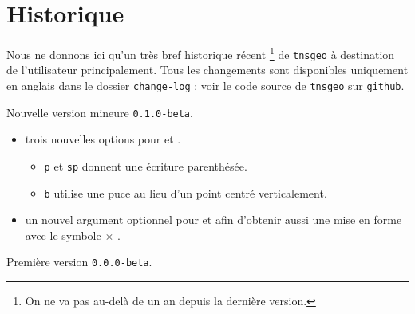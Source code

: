 \documentclass[12pt,a4paper]{article}
\begin{document}
\newpage

\section{Historique}

Nous ne donnons ici qu'un très bref historique récent
\footnote{
	On ne va pas au-delà de un an depuis la dernière version.
}
de \verb+tnsgeo+ à destination de l'utilisateur principalement.
Tous les changements sont disponibles uniquement en anglais dans le dossier \verb+change-log+ : voir le code source de \verb+tnsgeo+ sur \verb+github+.

\begin{description}

    \medskip
    \item[2020-07-17] Nouvelle version mineure \verb+0.1.0-beta+.
    
    \begin{itemize}[itemsep=.5em]
        \item {}
              trois nouvelles options pour  et .
        \begin{itemize}[itemsep=.5em]
            \item \verb+p+ et \verb+sp+ donnent une écriture parenthésée.
    
            \item \verb+b+ utilise une puce au lieu d'un point centré verticalement.
        \end{itemize}
    
    
        \item {}
              un nouvel argument optionnel pour  et  afin d'obtenir aussi une mise en forme avec le symbole $\times$ .
    \end{itemize}
    
    \separation


    \medskip
    \item[2020-07-10] Première version \verb+0.0.0-beta+.

\end{description}
\end{document}
